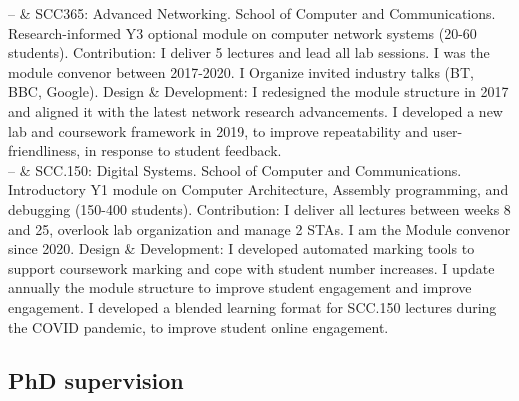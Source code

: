 \documentclass[10pt, a4paper]{article}
\newcommand{\LUSCC}{School of Computer and Communications}
\newcommand{\Duration}[2]{\fontsize{10pt}{0}\selectfont #1--#2}
\newcommand{\Ongoing}{}
\begin{document}
\begin{EntriesTable}
   \Duration{2017}{\Ongoing}  &
   SCC365: Advanced Networking. \LUSCC. \newline
Research-informed Y3 optional module on computer network systems (20-60
students). \newline
Contribution: I deliver 5 lectures and lead all lab sessions. I was the module
convenor between 2017-2020. I Organize invited industry talks (BT, BBC, Google).\newline
Design \& Development: I redesigned the module structure in 2017 and aligned it
with the latest network research advancements. I developed a new 
lab and coursework framework in 2019, to improve repeatability and
user-friendliness, in response to student feedback.
    \\
    \Duration{2016}{\Ongoing} &
    SCC.150: Digital Systems. \LUSCC.
    \newline
Introductory Y1 module on Computer Architecture, Assembly programming, and
debugging (150-400 students).
    \newline
Contribution: I deliver all lectures between weeks 8 and 25, overlook lab organization and
manage 2 STAs. I am the
Module convenor since 2020.\newline
Design \& Development: I developed automated marking tools to
support coursework marking and cope with student number increases. 
I update annually the module structure to improve student engagement and improve
engagement. I developed a blended learning format for SCC.150 lectures during
the COVID pandemic, to improve student online engagement.   
\end{EntriesTable}


\subsection{P\lowercase{h}D supervision}
\end{document}

